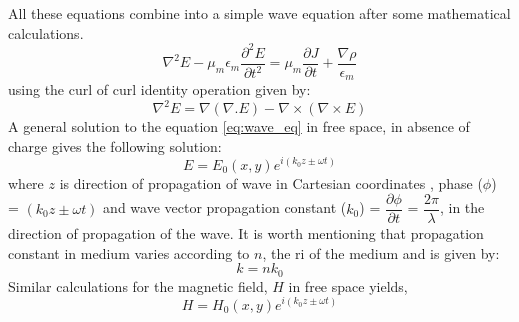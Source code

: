 \documentclass[../report.tex]{subfiles}
\begin{document}
All these equations combine into a simple wave equation after some mathematical calculations.
\begin{equation}\label{eq:wave_eq}
\nabla^2 E -  \mu_m\epsilon_m\frac{\partial^2 E}{\partial t^2} = \mu_m\frac{\partial J}{\partial t} + \frac{\nabla\rho}{\epsilon_m}	
\end{equation}
using the curl of curl identity operation given by: 
\begin{equation}\label{eq:curl_of_curl}
\nabla^2 E = \nabla(\nabla.E) - \nabla\times(\nabla\times E)
\end{equation}
A general solution to the equation \ref{eq:wave_eq} in free space, in absence of charge gives the following solution:
\begin{equation}\label{eq:wave_sol_electric}
E=E_{0}(x,y)e^{i\left(k_{0}z\pm \omega t\right)}
\end{equation}
where $z$ is direction of propagation of wave in Cartesian coordinates , phase ($\phi$) = $\left(k_{0}z\pm \omega t\right)$ and wave vector propagation constant ($k_0$) = $\dfrac {\partial \phi } {\partial t}$ = $\dfrac {2\pi } {\lambda }$, in the direction of propagation of the wave. It is worth mentioning that propagation constant in medium varies according to $n$, the \gls{ri} of the medium and is given by: 
\begin{equation}\label{eq:ri_med_val}
k = nk_0
\end{equation}
Similar calculations for the magnetic field, $H$ in free space yields, 		
\begin{equation}\label{eq:wave_sol_magnetic}
H=H_{0}(x,y)e^{i\left(k_{0}z\pm \omega t\right)}
\end{equation}
\end{document}
